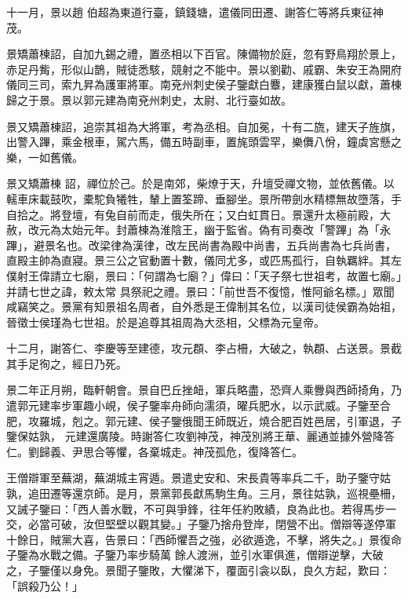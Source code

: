 \begin{pinyinscope}
 十一月，景以趙
 伯超為東道行臺，鎮錢塘，遣儀同田遷、謝答仁等將兵東征神茂。



 景矯蕭棟詔，自加九錫之禮，置丞相以下百官。陳備物於庭，忽有野鳥翔於景上，赤足丹觜，形似山鵲，賊徒悉駭，競射之不能中。景以劉勸、戚霸、朱安王為開府儀同三司，索九昇為護軍將軍。南兗州刺史侯子鑒獻白麞，建康獲白鼠以獻，蕭棟歸之于景。景以郭元建為南兗州刺史，太尉、北行臺如故。



 景又矯蕭棟詔，追崇其祖為大將軍，考為丞相。自加冕，十有二旒，建天子旌旗，出警入蹕，乘金根車，駕六馬，備五時副車，置旄頭雲罕，樂儛八佾，鐘虡宮懸之樂，一如舊儀。



 景又矯蕭棟
 詔，禪位於己。於是南郊，柴燎于天，升壇受禪文物，並依舊儀。以轜車床載鼓吹，橐駝負犧牲，輦上置筌蹄、垂腳坐。景所帶劍水精標無故墮落，手自拾之。將登壇，有兔自前而走，俄失所在；又白虹貫日。景還升太極前殿，大赦，改元為太始元年。封蕭棟為淮陰王，幽于監省。偽有司奏改「警蹕」為「永蹕」，避景名也。改梁律為漢律，改左民尚書為殿中尚書，五兵尚書為七兵尚書，直殿主帥為直寢。景三公之官動置十數，儀同尤多，或匹馬孤行，自執羈絆。其左僕射王偉請立七廟，景曰：「何謂為七廟？」偉曰：「天子祭七世祖考，故置七廟。」并請七世之諱，敕太常
 具祭祀之禮。景曰：「前世吾不復憶，惟阿爺名標。」眾聞咸竊笑之。景黨有知景祖名周者，自外悉是王偉制其名位，以漢司徒侯霸為始祖，晉徵士侯瑾為七世祖。於是追尊其祖周為大丞相，父標為元皇帝。



 十二月，謝答仁、李慶等至建德，攻元頵、李占柵，大破之，執頵、占送景。景截其手足徇之，經日乃死。



 景二年正月朔，臨軒朝會。景自巴丘挫衄，軍兵略盡，恐齊人乘釁與西師掎角，乃遣郭元建率步軍趣小峴，侯子鑒率舟師向濡須，曜兵肥水，以示武威。子鑒至合肥，攻羅城，剋之。郭元建、侯子鑒俄聞王師既近，燒合肥百姓邑居，引軍退，子鑒保姑孰，
 元建還廣陵。時謝答仁攻劉神茂，神茂別將王華、麗通並據外營降答仁。劉歸義、尹思合等懼，各棄城走。神茂孤危，復降答仁。



 王僧辯軍至蕪湖，蕪湖城主宵遁。景遣史安和、宋長貴等率兵二千，助子鑒守姑孰，追田遷等還京師。是月，景黨郭長獻馬駒生角。三月，景往姑孰，巡視壘柵，又誡子鑒曰：「西人善水戰，不可與爭鋒，往年任約敗績，良為此也。若得馬步一交，必當可破，汝但堅壁以觀其變。」子鑒乃捨舟登岸，閉營不出。僧辯等遂停軍十餘日，賊黨大喜，告景曰：「西師懼吾之強，必欲遁逸，不擊，將失之。」景復命子鑒為水戰之備。子鑒乃率步騎萬
 餘人渡洲，並引水軍俱進，僧辯逆擊，大破之，子鑒僅以身免。景聞子鑒敗，大懼涕下，覆面引衾以臥，良久方起，歎曰：「誤殺乃公！」




\end{pinyinscope}
